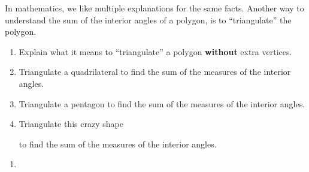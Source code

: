 \documentclass[nooutcomes,noauthor,hints]{ximera}
\begin{document}
\mynewpage


\begin{question}
  In mathematics, we like multiple explanations for the same
  facts. Another way to understand the sum of the interior angles of a
  polygon, is to ``triangulate'' the polygon. 
  \begin{enumerate}
  \item Explain what it means to ``triangulate'' a polygon
    \textbf{without} extra vertices.
  \item Triangulate a quadrilateral to find the sum of the measures of
    the interior angles. 
  \item Triangulate a pentagon to find the sum of the measures of
    the interior angles. 
  \item Triangulate this crazy shape
    \begin{center}
    \end{center}
    to find the sum of the measures of the interior angles.
  \end{enumerate}
  \begin{freeResponse}
    \begin{enumerate}
      \item 
    \end{enumerate}
  \end{freeResponse}
\end{question}
\end{document}
